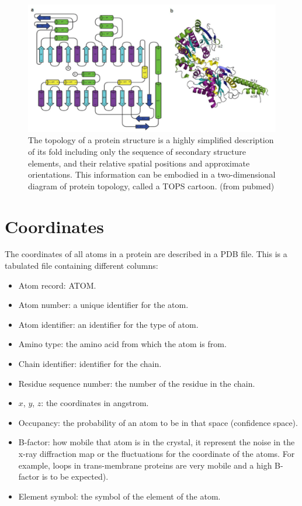 \begin{figure}[H]
			\centering
			\includegraphics[width=\textwidth]{topology.png}
			\caption{The topology of a protein structure is a highly simplified description of its fold including only the sequence of secondary structure elements, and their relative spatial positions and approximate orientations. This information can be embodied in a two-dimensional diagram of protein topology, called a TOPS cartoon. (from pubmed)}
			\label{fig:topology}
			\end{figure}


\section{Coordinates}
The coordinates of all atoms in a protein are described in a PDB file.
This is a tabulated file containing different columns:

\begin{multicols}{2}
	\begin{itemize}
		\item Atom record: ATOM.
		\item Atom number: a unique identifier for the atom.
		\item Atom identifier: an identifier for the type of atom.
		\item Amino type: the amino acid from which the atom is from.
		\item Chain identifier: identifier for the chain.
		\item Residue sequence number: the number of the residue in the chain.
		\item $x$, $y$, $z$: the coordinates in angstrom.
		\item Occupancy: the probability of an atom to be in that space (confidence space).
		\item B-factor: how mobile that atom is in the crystal, it represent the noise in the x-ray diffraction map or the fluctuations for the coordinate of the atoms. For example, loops in trans-membrane proteins are very mobile and a high B-factor is to be expected).
		\item Element symbol: the symbol of the element of the atom.
	\end{itemize}
\end{multicols}

